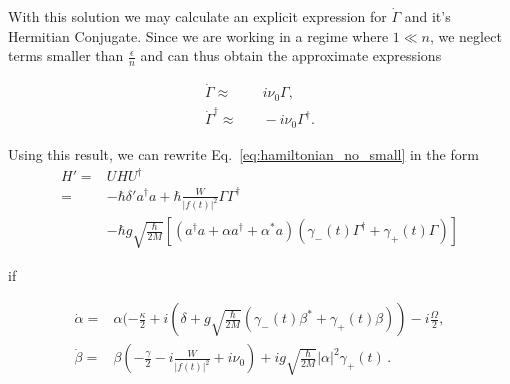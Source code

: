 \documentclass[reprint, amsmath,amssymb, aps,pra]{revtex4-1}
\begin{document}
With this solution we may calculate an explicit expression for
$\dot{\Gamma}$ and it's Hermitian Conjugate. Since we are working in a
regime where $1 \ll n$, we neglect terms smaller than
$\frac{\epsilon}{n}$ and can thus obtain the approximate expressions

\begin{align}\label{eq:DotGammavsGamma}
\dot{\Gamma} \approx & \quad i\nu_0\Gamma,\\
\dot{\Gamma}^\dagger \approx & \quad -i\nu_0\Gamma^\dagger.
\end{align}

Using this  result, we can rewrite Eq.~\eqref{eq:hamiltonian_no_small} in the form
\begin{align}\label{eq:hamiltonian_no_small_2}
  H'=&U H U^\dagger\nonumber\\=& -\hbar \delta' a^\dagger a + \hbar\frac{W}{|f(t)|^2}\Gamma \Gamma^\dagger\nonumber\\
     &-\hbar g\sqrt{\frac{\hbar}{2M}}[(a^{\dagger}a +\alpha a^{\dagger}+\alpha^* a)(\gamma_-(t)\Gamma^{\dagger}+\gamma_+(t)\Gamma)]
\end{align}

if 

\begin{align}\label{eq:displaced_frame_2}
\dot{\alpha} =& \alpha(-\frac{\kappa}{2}+i(\delta+g\sqrt{\frac{\hbar}{2M}}(\gamma_-(t) \beta^* + \gamma_+(t) \beta))-i\frac{\Omega}{2},\\
\dot{\beta} =& \beta(-\frac{\gamma}{2}-i\frac{W}{|f(t)|^2}+i\nu_0)+ig\sqrt{\frac{\hbar}{2M}}|\alpha|^2\gamma_+(t)\, .
\end{align}
\end{document}
